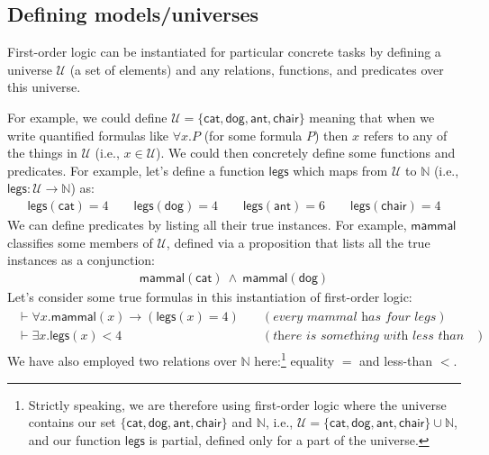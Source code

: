 \subsection{Defining models/universes}

First-order logic can be instantiated for particular concrete tasks by
defining a universe $\mathcal{U}$ (a set of elements) and any
relations, functions, and predicates over this universe.

For example, we could define
$\mathcal{U} = \{\mathsf{cat}, \mathsf{dog}, \mathsf{ant},
\mathsf{chair}\}$ meaning that when we write quantified formulas like
$\forall x . P$ (for some formula $P$) then $x$ refers to any of the things in
$\mathcal{U}$ (i.e., $x \in \mathcal{U}$). We could then concretely
define some functions and predicates. For example, let's define a function
$\mathsf{legs}$ which maps from $\mathcal{U}$ to $\mathbb{N}$ (i.e.,
$\mathsf{legs} : \mathcal{U} \rightarrow \mathbb{N}$) as:
%
\begin{align*}
  \mathsf{legs}(\mathsf{cat}) = 4 \qquad \mathsf{legs}(\mathsf{dog}) = 4 \qquad
  \mathsf{legs}(\mathsf{ant}) = 6 \qquad \mathsf{legs}(\mathsf{chair}) = 4
\end{align*}
%
We can define predicates by listing all their true instances. For
example, $\mathsf{mammal}$ classifies some members
of $\mathcal{U}$, defined via a proposition that lists all the true
instances as a conjunction:
%
\begin{align*}
  \mathsf{mammal}(\mathsf{cat})\ \wedge\
  \mathsf{mammal}(\mathsf{dog})
\end{align*}
%
Let's consider some true formulas in this instantiation of first-order
logic:
%
\begin{align*}
  \begin{array}{ll}
  \vdash \forall x . \mathsf{mammal}(x) \rightarrow (\mathsf{legs}(x) = 4) &
\quad (\textit{every mammal has four legs}) \\
  \vdash \exists x . \mathsf{legs}(x) < 4 &
\quad (\textit{there is something with less than four legs})
  \end{array}
\end{align*}
%
We have also employed two relations over $\mathbb{N}$ here:\footnote{Strictly speaking, we are
  therefore using first-order logic where the universe contains
  our set $\{\mathsf{cat}, \mathsf{dog}, \mathsf{ant},
  \mathsf{chair}\}$ and $\mathbb{N}$, i.e.,
  $\mathcal{U} = \{\mathsf{cat}, \mathsf{dog}, \mathsf{ant},
\mathsf{chair}\} \cup \mathbb{N}$, and our function $\mathsf{legs}$ is
partial, defined only for a part of the universe.}
equality $=$ and less-than $<$.

